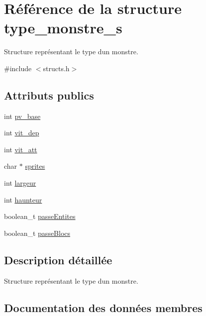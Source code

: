 \hypertarget{structtype__monstre__s}{}\section{Référence de la structure type\+\_\+monstre\+\_\+s}
\label{structtype__monstre__s}


Structure représentant le type d\textquotesingle{}un monstre.  




{\ttfamily \#include $<$structs.\+h$>$}

\subsection*{Attributs publics}
\begin{DoxyCompactItemize}
\item 
int \hyperlink{structtype__monstre__s_a37d1cae3dfb8de6ce15f2601a93cd1cc}{pv\+\_\+base}
\item 
int \hyperlink{structtype__monstre__s_a768470695da3d9377f1e7e97a3c45ed7}{vit\+\_\+dep}
\item 
int \hyperlink{structtype__monstre__s_a5bb66d5b722fc97f901c5eaf7d621fd4}{vit\+\_\+att}
\item 
char $\ast$ \hyperlink{structtype__monstre__s_a20b80d2c595e2a211a48d548cb02f5f3}{sprites}
\item 
int \hyperlink{structtype__monstre__s_aad3de2b9e1e4199ed5c0a1cb43bfc259}{largeur}
\item 
int \hyperlink{structtype__monstre__s_ac5de8e033545707dad2589d421abb672}{haunteur}
\item 
boolean\+\_\+t \hyperlink{structtype__monstre__s_a03f34ddaadae9f002130e70844f142f1}{passe\+Entites}
\item 
boolean\+\_\+t \hyperlink{structtype__monstre__s_a0f60370f9ae95fff9ab024fbf6485df6}{passe\+Blocs}
\end{DoxyCompactItemize}


\subsection{Description détaillée}
Structure représentant le type d\textquotesingle{}un monstre. 

\subsection{Documentation des données membres}
\mbox{\label{structtype__monstre__s_ac5de8e033545707dad2589d421abb672}} 
